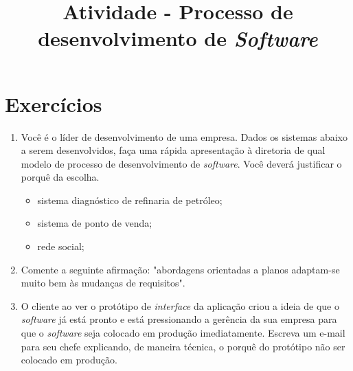 \documentclass[12pt,a4paper]{article}
\title{Atividade - Processo de desenvolvimento de \textit{Software}}
\author{}
\date{}
\begin{document}
   \maketitle
   \section*{Exercícios}
      \begin{enumerate}
         \item Você é o líder de desenvolvimento de uma empresa. Dados os sistemas abaixo a serem desenvolvidos, faça uma rápida apresentação à diretoria de qual modelo de processo de desenvolvimento de \textit{software}. Você deverá justificar o porquê da escolha.
         \begin{itemize}
            \item sistema diagnóstico de refinaria de petróleo;
         	\item sistema de ponto de venda;
         	\item rede social;
         \end{itemize}
         \item Comente a seguinte afirmação: "abordagens orientadas a planos adaptam-se muito bem às mudanças de requisitos".
         \item O cliente ao ver o protótipo de \textit{interface} da aplicação criou a ideia de que o \textit{software} já está pronto e está pressionando a gerência da sua empresa para que o \textit{software} seja colocado em produção imediatamente. Escreva um e-mail para seu chefe explicando, de maneira técnica, o porquê do protótipo não ser colocado em produção.
      \end{enumerate}
      
\end{document}
